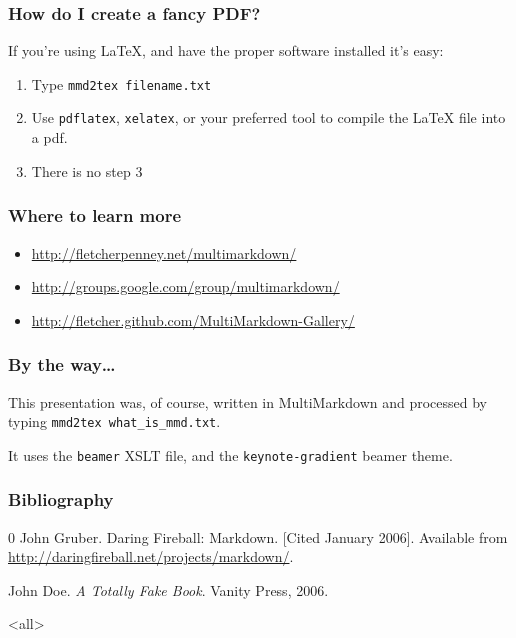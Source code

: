 \documentclass[ignorenonframetext,12pt,aspectratio=169]{beamer}
\begin{document}
\begin{frame}[fragile]
\frametitle{How do I create a fancy PDF?}
\label{howdoicreateafancypdf}

If you're using LaTeX, and have the proper software installed it's easy:

\begin{enumerate}
\item Type \texttt{mmd2tex filename.txt}
\item Use \texttt{pdflatex}, \texttt{xelatex}, or your preferred tool to compile the LaTeX
file into a pdf.
\item There is no step 3
\end{enumerate}

\end{frame}

\begin{frame}[fragile]
\frametitle{Where to learn more}
\label{wheretolearnmore}

\begin{itemize}
\item \href{http://fletcherpenney.net/multimarkdown/}{http://fletcherpenney.net/multimarkdown/}
\item \href{http://groups.google.com/group/multimarkdown/}{http://groups.google.com/group/multimarkdown/}
\item \href{http://fletcher.github.com/MultiMarkdown-Gallery/}{http://fletcher.github.com/MultiMarkdown-Gallery/}
\end{itemize}

\end{frame}

\begin{frame}[fragile]
\frametitle{By the way{\ldots}}
\label{bytheway...}

This presentation was, of course, written in MultiMarkdown and processed by
typing \texttt{mmd2tex what\_is\_mmd.txt}.

It uses the \texttt{beamer} XSLT file, and the \texttt{keynote-gradient} beamer theme.
\end{frame}


\begin{frame}[allowframebreaks]
\frametitle{Bibliography}
\def\newblock{}
\begin{thebibliography}{0}
John Gruber. Daring Fireball: Markdown. [Cited January 2006]. Available from \href{http://daringfireball.net/projects/markdown/}{http://daringfireball.net/projects/markdown/}.

John Doe. \emph{A Totally Fake Book}. Vanity Press, 2006.

\end{thebibliography}
\end{frame}
\mode<all>
\ifdefined\makethankyou
\makethankyou
\fi
\end{document}
